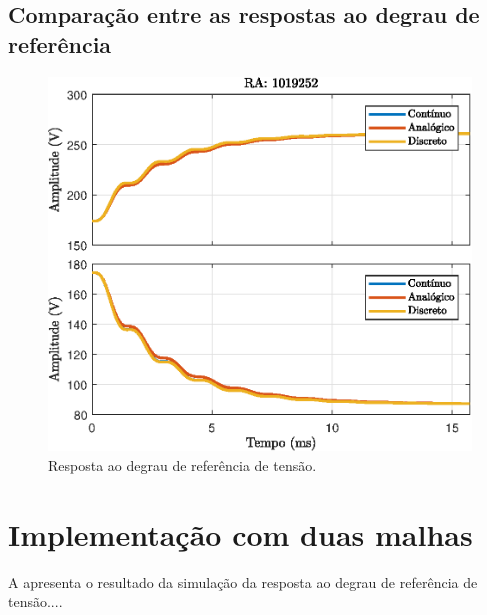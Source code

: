 \subsection{Comparação entre as respostas ao degrau de referência}


\begin{figure}[!ht]
	\centering
	\includegraphics[width=0.9\linewidth]{Figs/BoostStepResponse1malhaTodos}
	\caption{Resposta ao degrau de referência de tensão.}
	\label{fig:BoostStepResponse1malhaTodos}
\end{figure}


\section{Implementação com duas malhas}






A  apresenta o resultado da simulação da resposta ao degrau de referência de tensão....

